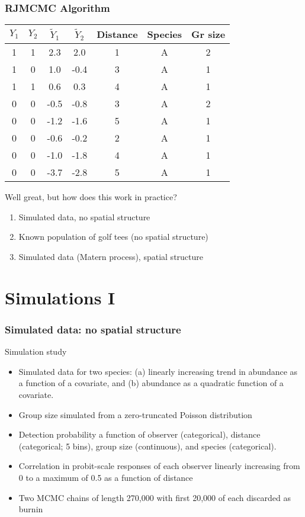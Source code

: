 \documentclass[serif,mathserif]{beamer}
\begin{document}
\begin{frame}
  \frametitle{RJMCMC Algorithm}
         \begin{tabular}{ccccccc}
        \hline \hline
        $Y_1$ & $Y_2$ & $\tilde{Y}_1$ & $\tilde{Y}_2$ & Distance & Species & Gr size\\
        \hline
        1 & 1 & 2.3 & 2.0 & 1 & A & 2\\
        1 & 0 & 1.0 & -0.4 & 3 & A & 1 \\
        1 & 1 & 0.6 & 0.3 & 4 & A & 1 \\
        0 & 0 & -0.5 & -0.8 & 3 & A & 2 \\
        0 & 0 & -1.2 & -1.6 & 5 & A & 1 \\
        0 & 0 & \cellcolor{noaaturq} -0.6 & \cellcolor{noaaturq} -0.2 & 2 & A & 1 \\
        0 & 0 & \cellcolor{noaaturq} -1.0 & \cellcolor{noaaturq} -1.8 & 4 & A & 1 \\
        0 & 0 & \cellcolor{noaaturq} -3.7 & \cellcolor{noaaturq} -2.8 & 5 & A & 1 \\
         \hline
        \end{tabular}
\end{frame}

\begin{frame}
  Well great, but how does this work in practice?
  \begin{enumerate}
    \item Simulated data, no spatial structure
    \item Known population of golf tees (no spatial structure)
    \item Simulated data (Matern process), spatial structure
  \end{enumerate}
\end{frame}

\section{Simulations I}
\begin{frame}
  \frametitle{Simulated data: no spatial structure}
  \begin{block}{Simulation study}
  \begin{itemize}
  \item Simulated data for two species: (a) linearly increasing trend in abundance as a function of a covariate, and (b) abundance as a quadratic function of a covariate.
  \item Group size simulated from a zero-truncated Poisson distribution
  \item Detection probability a function of observer (categorical), distance (categorical; 5 bins), group size (continuous), and species (categorical).
  \item Correlation in probit-scale responses of each observer linearly increasing from 0 to a maximum of 0.5 as a function of distance
  \item Two MCMC chains of length 270,000 with first 20,000 of each discarded as burnin
  \end{itemize}
  \end{block}
\end{frame}
\end{document}
